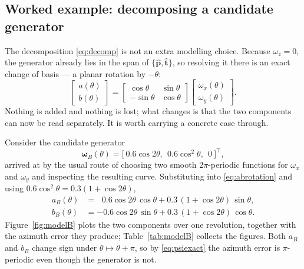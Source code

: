 \documentclass[11pt,a4paper]{article}
\newcommand{\phat}{\hat{\bm{p}}}
\newcommand{\that}{\hat{\bm{t}}}
\begin{document}
\subsection{Worked example: decomposing a candidate generator}
\label{sec:modelB}

The decomposition \eqref{eq:decomp} is not an extra modelling choice. Because
$\omega_z = 0$, the generator already lies in the span of $\{\phat,\that\}$, so
resolving it there is an exact change of basis --- a planar rotation by
$-\theta$:
\begin{equation}
\begin{bmatrix} a(\theta) \\ b(\theta) \end{bmatrix}
=
\begin{bmatrix} \cos\theta & \sin\theta \\ -\sin\theta & \cos\theta \end{bmatrix}
\begin{bmatrix} \omega_x(\theta) \\ \omega_y(\theta) \end{bmatrix}.
\label{eq:abrotation}
\end{equation}
Nothing is added and nothing is lost; what changes is that the two components
can now be read separately. It is worth carrying a concrete case through.

Consider the candidate generator
\begin{equation}
\bm\omega_B(\theta) = \big[\ 0.6\cos2\theta,\ \ 0.6\cos^2\theta,\ \ 0\ \big]^\top ,
\label{eq:modelB}
\end{equation}
arrived at by the usual route of choosing two smooth $2\pi$-periodic functions
for $\omega_x$ and $\omega_y$ and inspecting the resulting curve. Substituting
into \eqref{eq:abrotation} and using $0.6\cos^2\theta = 0.3(1+\cos2\theta)$,
\begin{align}
a_B(\theta) &= \ \ \,0.6\cos2\theta\,\cos\theta + 0.3\,(1+\cos2\theta)\,\sin\theta, \label{eq:aB}\\
b_B(\theta) &= -0.6\cos2\theta\,\sin\theta + 0.3\,(1+\cos2\theta)\,\cos\theta . \label{eq:bB}
\end{align}
Figure~\ref{fig:modelB} plots the two components over one revolution, together
with the azimuth error they produce; Table~\ref{tab:modelB} collects the
figures. Both $a_B$ and $b_B$ change sign under $\theta\mapsto\theta+\pi$, so
by \eqref{eq:psiexact} the azimuth error is $\pi$-periodic even though the
generator is not.
\end{document}

